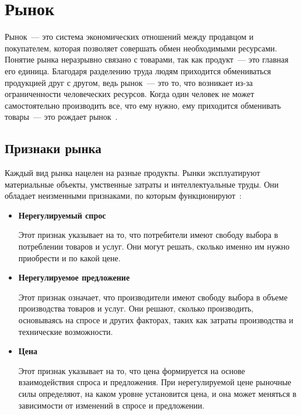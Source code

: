 \chapter{Рынок}

Рынок~--- это система экономических отношений между продавцом и покупателем, которая позволяет совершать обмен необходимыми ресурсами. 
Понятие рынка неразрывно связано с товарами, так как продукт~--- это главная его единица. 
Благодаря разделению труда людям приходится обмениваться продукцией друг с другом, ведь рынок~--- это то, что возникает из-за ограниченности человеческих ресурсов. 
Когда один человек не может самостоятельно производить все, что ему нужно, ему приходится обменивать товары~--- это рождает рынок~\cite{market}.

\section{Признаки рынка}
Каждый вид рынка нацелен на разные продукты. 
Рынки эксплуатируют материальные объекты, умственные затраты и интеллектуальные труды. 
Они обладает неизменными признаками, по которым функционируют~\cite{market}:
\begin{itemize}
	\item \textbf{Нерегулируемый спрос} 
	
	Этот признак указывает на то, что потребители имеют свободу выбора в потреблении товаров и услуг. 
	Они могут решать, сколько именно им нужно приобрести и по какой цене.
	\item \textbf{Нерегулируемое предложение}
	
	Этот признак означает, что производители имеют свободу выбора в объеме производства товаров и услуг. 
	Они решают, сколько производить, основываясь на спросе и других факторах, таких как затраты производства и технические возможности.
	\item \textbf{Цена}
	 
	Этот признак указывает на то, что цена формируется на основе взаимодействия спроса и предложения. 
	При нерегулируемой цене рыночные силы определяют, на каком уровне установится цена, и она может меняться в зависимости от изменений в спросе и предложении.
\end{itemize}

